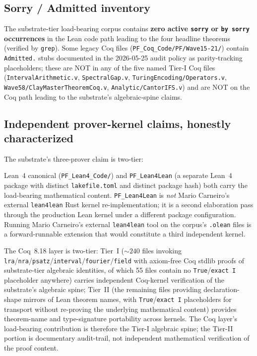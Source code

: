\documentclass[11pt,a4paper]{amsart}
\theoremstyle{plain}
\theoremstyle{definition}
\begin{document}
\subsection{Sorry / Admitted inventory}\label{subsec:repro-sorry}

The substrate-tier load-bearing corpus contains \textbf{zero active \texttt{sorry} or \texttt{by sorry} occurrences} in the Lean code path leading to the four headline theorems (verified by \texttt{grep}). Some legacy Coq files (\texttt{PF\_Coq\_Code/PF/Wave15-21/}) contain \texttt{Admitted.} stubs documented in the 2026-05-25 audit policy as parity-tracking placeholders; these are NOT in any of the five named Tier-I Coq files (\texttt{IntervalArithmetic.v}, \texttt{SpectralGap.v}, \texttt{TuringEncoding/Operators.v}, \texttt{Wave58/ClayMasterTheoremCoq.v}, \texttt{Analytic/CantorIFS.v}) and are NOT on the Coq path leading to the substrate's algebraic-spine claims.

\subsection{Independent prover-kernel claims, honestly characterized}\label{subsec:repro-three-prover}

The substrate's three-prover claim is two-tier:

\begin{description}[font=\normalfont\bfseries,leftmargin=2em,itemsep=2pt]
\item[Load-bearing mathematical verification (two provers).] Lean~4 canonical (\texttt{PF\_Lean4\_Code/}) and \texttt{PF\_Lean4Lean} (a separate Lean~4 package with distinct \texttt{lakefile.toml} and distinct package hash) both carry the load-bearing mathematical content. \texttt{PF\_Lean4Lean} is \emph{not} Mario Carneiro's external \texttt{lean4lean} Rust kernel re-implementation; it is a second elaboration pass through the production Lean kernel under a different package configuration. Running Mario Carneiro's external \texttt{lean4lean} tool on the corpus's \texttt{.olean} files is a forward-runnable extension that would constitute a third independent kernel.
\item[Structural audit-trail mirror (Coq).] The Coq~8.18 layer is two-tier: Tier~I ($\sim 240$ files invoking \texttt{lra}/\texttt{nra}/\texttt{psatz}/\texttt{interval}/\texttt{fourier}/\texttt{field} with axiom-free Coq stdlib proofs of substrate-tier algebraic identities, of which 55 files contain no \texttt{True}/\texttt{exact I} placeholder anywhere) carries independent Coq-kernel verification of the substrate's algebraic spine; Tier~II (the remaining files providing declaration-shape mirrors of Lean theorem names, with \texttt{True}/\texttt{exact I} placeholders for transport without re-proving the underlying mathematical content) provides theorem-name and type-signature portability across kernels. The Coq layer's load-bearing contribution is therefore the Tier-I algebraic spine; the Tier-II portion is documentary audit-trail, not independent mathematical verification of the proof content.
\end{description}
\end{document}
